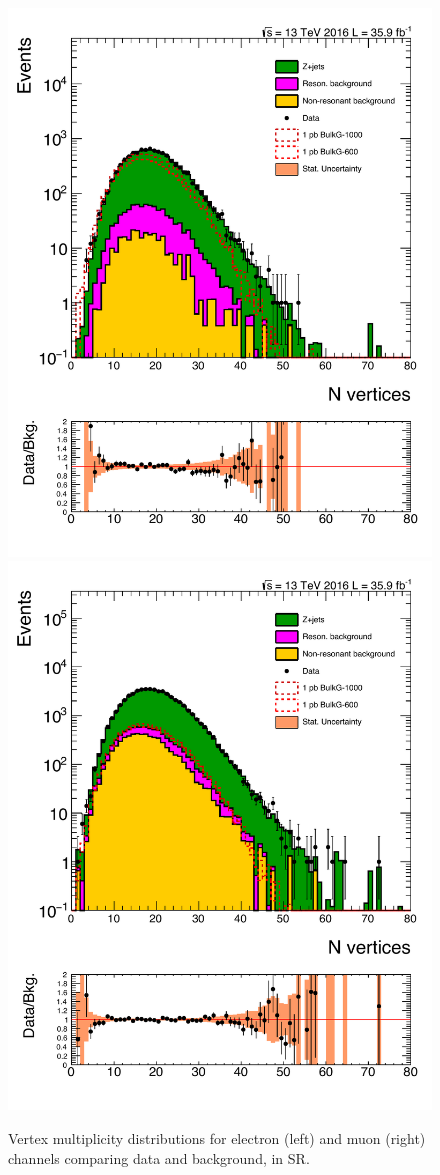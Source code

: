 \begin{figure}[htbp!]
\centering
\includegraphics[width=0.46\linewidth, page=2]{figures/ReMiniSummer16_DT_PhReMiniMCRcFixXsec_GMCPhPtWt_SRdPhiGT0p5_puWeightsummer16_muoneg_gjet_metfilter_unblind_el_log_1pb.pdf}
\includegraphics[width=0.46\linewidth, page=2]{figures/ReMiniSummer16_DT_PhReMiniMCRcFixXsec_GMCPhPtWt_SRdPhiGT0p5_puWeightsummer16_muoneg_gjet_metfilter_unblind_mu_log_1pb.pdf}
\caption{Vertex multiplicity distributions for electron (left) and muon (right)
channels comparing data and background, in SR.}
\label{fig:SR_gjet_nvtx}
\end{figure}


